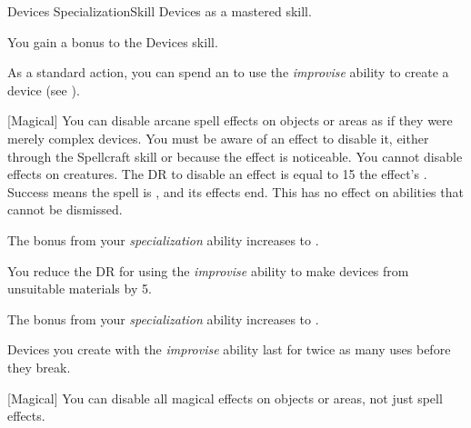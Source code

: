     \begin{feat}{Devices Specialization}{Skill}
        \featpre Devices as a mastered skill.

         You gain a  bonus to the Devices skill.

         As a standard action, you can spend an  to use the \textit{improvise} ability to create a device (see ).

        [Magical] You can disable arcane spell effects on objects or areas as if they were merely complex devices.
        You must be aware of an effect to disable it, either through the Spellcraft skill or because the effect is noticeable.
        You cannot disable effects on creatures.
        The DR to disable an effect is equal to 15 \add the effect's .
        Success means the spell is , and its effects end.
        This has no effect on abilities that cannot be dismissed.

         The bonus from your \textit{specialization} ability increases to .

         You reduce the DR for using the \textit{improvise} ability to make devices from unsuitable materials by 5.

         The bonus from your \textit{specialization} ability increases to .

         Devices you create with the \textit{improvise} ability last for twice as many uses before they break.

        [Magical] You can disable all magical effects on objects or areas, not just spell effects.
    \end{feat}

